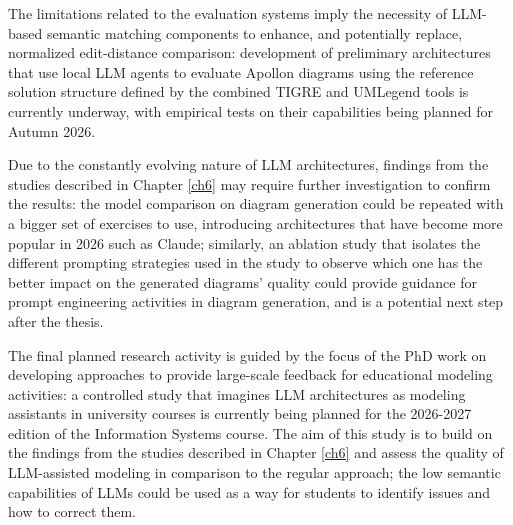 The limitations related to the evaluation systems imply the necessity of LLM-based semantic matching components to enhance, and potentially replace, normalized edit-distance comparison: development of preliminary architectures that use local LLM agents to evaluate Apollon diagrams using the reference solution structure defined by the combined TIGRE and UMLegend tools is currently underway, with empirical tests on their capabilities being planned for Autumn 2026.

Due to the constantly evolving nature of LLM architectures, findings from the studies described in Chapter \ref{ch6} may require further investigation to confirm the results: the model comparison on diagram generation could be repeated with a bigger set of exercises to use, introducing architectures that have become more popular in 2026 such as Claude; similarly, an ablation study that isolates the different prompting strategies used in the study to observe which one has the better impact on the generated diagrams' quality could provide guidance for prompt engineering activities in diagram generation, and is a potential next step after the thesis.  

The final planned research activity is guided by the focus of the PhD work on developing approaches to provide large-scale feedback for educational modeling activities: a controlled study that imagines LLM architectures as modeling assistants in university courses is currently being planned for the 2026-2027 edition of the Information Systems course. The aim of this study is to build on the findings from the studies described in Chapter \ref{ch6} and assess the quality of LLM-assisted modeling in comparison to the regular approach; the low semantic capabilities of LLMs could be used as a way for students to identify issues and how to correct them.

